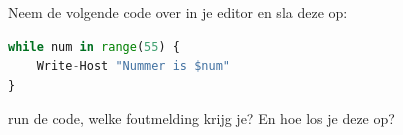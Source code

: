 Neem de volgende code over in je editor en sla deze op:
\begin{lstlisting}[language=python]
while num in range(55) {
    Write-Host "Nummer is $num"
}
\end{lstlisting}
run de code, welke foutmelding krijg je? En hoe los je deze op?

